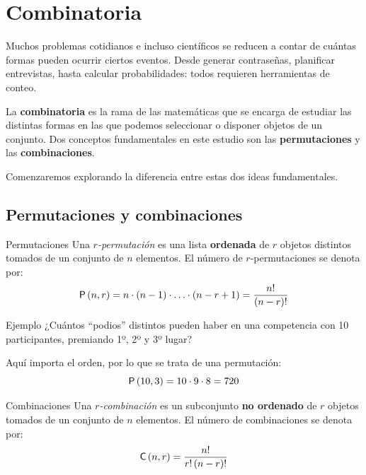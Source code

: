 




\section{Combinatoria}


Muchos problemas cotidianos e incluso científicos se reducen a contar de cuántas formas pueden ocurrir ciertos eventos. Desde generar contraseñas, planificar entrevistas, hasta calcular probabilidades: todos requieren herramientas de conteo.

La \textbf{combinatoria} es la rama de las matemáticas que se encarga de estudiar las distintas formas en las que podemos seleccionar o disponer objetos de un conjunto. Dos conceptos fundamentales en este estudio son las \textbf{permutaciones} y las \textbf{combinaciones}.

Comenzaremos explorando la diferencia entre estas dos ideas fundamentales.

\subsection{Permutaciones y combinaciones}

\begin{definitionblock}{Permutaciones}
Una \emph{$r$-permutación} es una lista \textbf{ordenada} de $r$ objetos distintos tomados de un conjunto de $n$ elementos. El número de $r$-permutaciones se denota por:
\[
\mathsf{P}\left(n,r\right) = n \cdot (n - 1) \cdot \ldots \cdot (n - r + 1) = \frac{n!}{(n-r)!}
\]
\end{definitionblock}

\begin{exampleblock}{Ejemplo}
¿Cuántos ``podios'' distintos pueden haber en una competencia con 10 participantes, premiando 1º, 2º y 3º lugar?

Aquí importa el orden, por lo que se trata de una permutación:
\[
\mathsf{P}\left(10,3\right) = 10 \cdot 9 \cdot 8 = 720
\]
\end{exampleblock}

\begin{definitionblock}{Combinaciones}
Una \emph{$r$-combinación} es un subconjunto \textbf{no ordenado} de $r$ objetos tomados de un conjunto de $n$ elementos. El número de combinaciones se denota por:
\[
\mathsf{C}\left(n,r\right) = \frac{n!}{r! \, (n - r)!}
\]
\end{definitionblock}

